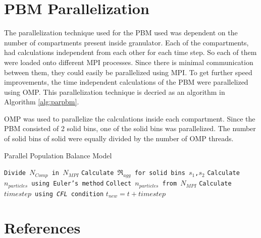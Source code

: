 \documentclass[preprint,11pt,authoryear]{elsarticle}
\begin{document}
\appendix
\section{PBM Parallelization}
\label{app:parallelPBM}
The parallelization technique used for the PBM used was dependent on the number of 
compartments present inside granulator. Each of the compartments, had calculations 
independent from each other for each time step. So each of them were loaded 
onto different MPI processes. Since there is minimal communication between them, 
they could easily be parallelized using MPI. To get further speed improvements, 
the time independent calculations of the PBM were parallelized using OMP. This 
parallelization technique is decried as an algorithm in Algorithm \ref{alg:parpbm}.

OMP was used to parallelize the calculations inside each compartment. Since 
the PBM consisted of 2 solid bins, one of the solid bins was parallelized. 
The number of solid bins of solid were equally divided by the number of OMP threads. 

     \begin{algorithm}[H]
     \scriptsize
     \caption{Parallel Population Balance Model}
     \label{alg:parallelPBM}
     \begin{algorithmic}[1]
     \State \texttt{Divide $N_{Comp}$ in $N_{MPI}$}
     \State \texttt{Calculate $\Re_{agg}$ for solid bins $s_1$,$s_2$}
     \EndFor 
     \State \texttt{Calculate $n_{particles}$ using Euler's method}
     \EndFor
     \State \texttt{Collect $n_{particles}$ from $N_{MPI}$}
     \State \texttt{Calculate $timestep$ using \textit{CFL} condition}
     \State \texttt{$t_{new} = t + timestep$ }
     \EndWhile
     \EndProcedure
     \end{algorithmic}
 \label{alg:parpbm}
 \end{algorithm}     

 

\section*{References} 


\end{document}
